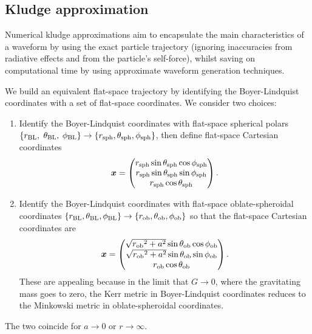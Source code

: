 \subsection{Kludge approximation}

Numerical kludge approximations aim to encapsulate the main characteristics of a waveform by using the exact particle trajectory (ignoring inaccuracies from radiative effects and from the particle's self-force), whilst saving on computational time by using approximate waveform generation techniques.

We build an equivalent flat-space trajectory by identifying the Boyer-Lindquist coordinates with a set of flat-space coordinates. We consider two choices:
\begin{enumerate}
\item Identify the Boyer-Lindquist coordinates with flat-space spherical polars $\{r_\mathrm{BL},$ $\theta_\mathrm{BL},$ $\phi_\mathrm{BL}\} \rightarrow \{r_\mathrm{sph}, \theta_\mathrm{sph}, \phi_\mathrm{sph}\}$, then define flat-space Cartesian coordinates \citep{Gair2005, Babak2007}
\begin{equation}
\boldsymbol{x} = \begin{pmatrix}
r_\mathrm{sph} \sin\theta_\mathrm{sph}\cos\phi_\mathrm{sph} \\
r_\mathrm{sph} \sin\theta_\mathrm{sph}\sin\phi_\mathrm{sph} \\
r_\mathrm{sph} \cos\theta_\mathrm{sph}
\end{pmatrix}.
\end{equation}
\item Identify the Boyer-Lindquist coordinates with flat-space oblate-spheroidal coordinates $\{r_\mathrm{BL}, \theta_\mathrm{BL}, \phi_\mathrm{BL}\} \rightarrow \{r_\mathrm{ob}, \theta_\mathrm{ob}, \phi_\mathrm{ob}\}$ so that the flat-space Cartesian coordinates are
\begin{equation}
\boldsymbol{x} = \begin{pmatrix}
\sqrt{{r_\mathrm{ob}}^2 + a^2} \sin\theta_\mathrm{ob}\cos\phi_\mathrm{ob} \\
\sqrt{{r_\mathrm{ob}}^2 + a^2} \sin\theta_\mathrm{ob}\sin\phi_\mathrm{ob} \\
r_\mathrm{ob} \cos\theta_\mathrm{ob}
\end{pmatrix}.
\end{equation}
These are appealing because in the limit that $G \rightarrow 0$, where the gravitating mass goes to zero, the Kerr metric in Boyer-Lindquist coordinates reduces to the Minkowski metric in oblate-spheroidal coordinates.
\end{enumerate}
The two coincide for $a \rightarrow 0$ or $r \rightarrow \infty$.

